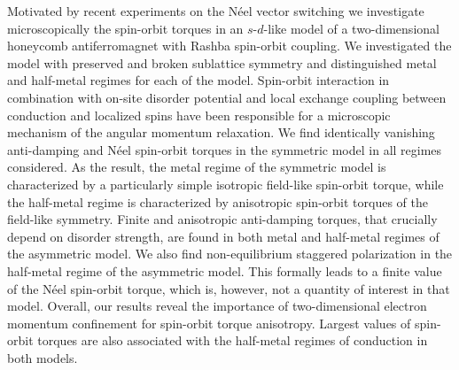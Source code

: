 Motivated by recent experiments on the N\'eel vector switching we investigate microscopically the spin-orbit torques in an $s$-$d$-like model of a two-dimensional honeycomb antiferromagnet with Rashba spin-orbit coupling. We investigated the model with preserved and broken sublattice symmetry and distinguished metal and half-metal regimes for each of the model. Spin-orbit interaction in combination with on-site disorder potential and local exchange coupling between conduction and localized spins have been responsible for a microscopic mechanism of the angular momentum relaxation. We find identically vanishing anti-damping and N\'eel spin-orbit torques in the symmetric model in all regimes considered. As the result, the metal regime of the symmetric model is characterized by a particularly simple isotropic field-like spin-orbit torque, while the half-metal regime is characterized by anisotropic spin-orbit torques of the field-like symmetry.  Finite and anisotropic anti-damping torques, that crucially depend on disorder strength, are found in both metal and half-metal regimes of the asymmetric model. We also find non-equilibrium staggered polarization in the half-metal regime of the asymmetric model. This formally leads to a finite value of the N\'eel spin-orbit torque, which is, however, not a quantity of interest in that model. Overall, our results reveal the importance of two-dimensional electron momentum confinement for spin-orbit torque anisotropy. Largest values of spin-orbit torques are also associated with the half-metal regimes of conduction in both models. 



